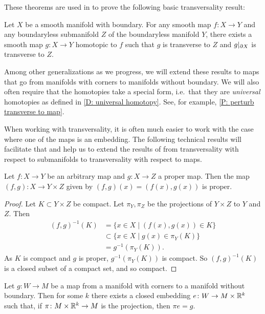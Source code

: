 These theorems are used in \cite{GuPo74} to prove the following basic transversality result:

\begin{theorem}
	Let $X$ be a smooth manifold with boundary.
	For any smooth map $f \colon X \to Y$ and any boundaryless submanifold $Z$ of the boundaryless manifold $Y$, there exists a smooth map $g \colon X \to Y$ homotopic to $f$ such that $g$ is transverse to $Z$ and $g|_{\partial X}$ is transverse to $Z$.
\end{theorem}

Among other generalizations as we progress, we will extend these results to maps that go from manifolds with corners to manifolds without boundary.
We will also often require that the homotopies take a special form, i.e.\ that they are \textit{universal} homotopies as defined in \cref{D: universal homotopy}.
See, for example, \cref{P: perturb transverse to map}.

When working with transversality, it is often much easier to work with the case where one of the maps is an embedding.
The following technical results will facilitate that and help us to extend the results of \cite{GuPo74} from transversality with respect to submanifolds to transversality with respect to maps.

\begin{lemma}\label{L: proper product}
	Let $f \colon X \to Y$ be an arbitrary map and $g \colon X \to Z$ a proper map.
	Then the map $(f,g) \colon X \to Y \times Z$ given by $(f,g)(x)=(f(x),g(x))$ is proper.
\end{lemma}

\begin{proof}
	Let $K \subset Y \times Z$ be compact.
	Let $\pi_Y,\pi_Z$ be the projections of $Y \times Z$ to $Y$ and $Z$. Then
	\begin{align*}
		(f,g)^{-1}(K) &= \{x \in X \mid (f(x),g(x)) \in K \}\\
		&\subset \{ x \in X \mid g(x) \in \pi_Y(K)\}\\
		&= g^{-1}(\pi_Y(K)).
	\end{align*}
	As $K$ is compact and $g$ is proper, $g^{-1}(\pi_Y(K))$ is compact.
	So $(f,g)^{-1}(K)$ is a closed subset of a compact set, and so compact.
\end{proof}

\begin{corollary}\label{C: embed V}
Let $g \colon W \to M$ be a map from a manifold with corners to a manifold without boundary.
Then for some $k$ there exists a closed embedding $e \colon W \to M \times \mathbb{R}^k$ such that, if $\pi \colon M \times \mathbb{R}^k \to M$ is the projection, then $\pi e = g$.
\end{corollary}

